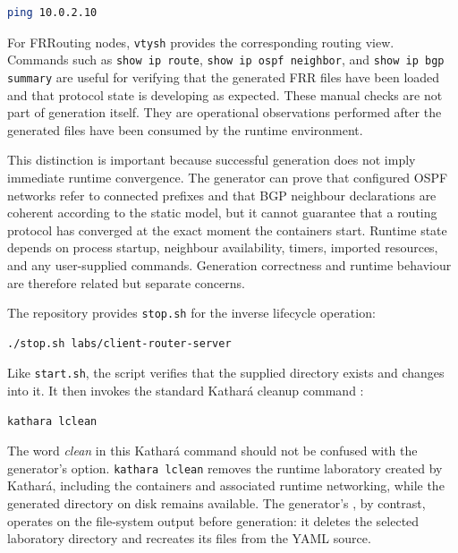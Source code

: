 \begin{lstlisting}[language=bash,caption={Basic reachability check after laboratory startup.},label={lst:basic-ping}]
ping 10.0.2.10
\end{lstlisting}

For FRRouting nodes, \texttt{vtysh} provides the corresponding routing view.
Commands such as \texttt{show ip route}, \texttt{show ip ospf neighbor}, and
\texttt{show ip bgp summary} are useful for verifying that the generated FRR
files have been loaded and that protocol state is developing as expected. These
manual checks are not part of generation itself. They are operational
observations performed after the generated files have been consumed by the
runtime environment.

This distinction is important because successful generation does not imply
immediate runtime convergence. The generator can prove that configured OSPF
networks refer to connected prefixes and that BGP neighbour declarations are
coherent according to the static model, but it cannot guarantee that a routing
protocol has converged at the exact moment the containers start. Runtime state
depends on process startup, neighbour availability, timers, imported resources,
and any user-supplied commands. Generation correctness and runtime behaviour
are therefore related but separate concerns.

The repository provides \texttt{stop.sh} for the inverse lifecycle operation:

\begin{lstlisting}[language=bash,caption={Stopping and cleaning the runtime environment.},label={lst:stop-lab}]
./stop.sh labs/client-router-server
\end{lstlisting}

Like \texttt{start.sh}, the script verifies that the supplied directory exists
and changes into it. It then invokes the standard Kathar\'a cleanup command
\cite{kathara_manpage}:

\begin{lstlisting}[language=bash,caption={Kathar\'a command executed by stop.sh.},label={lst:kathara-lclean}]
kathara lclean
\end{lstlisting}

The word \emph{clean} in this Kathar\'a command should not be confused with the
generator's  option. \texttt{kathara lclean} removes the
runtime laboratory created by Kathar\'a, including the containers and associated
runtime networking, while the generated directory on disk remains available.
The generator's , by contrast, operates on the file-system
output before generation: it deletes the selected laboratory directory and
recreates its files from the YAML source.

